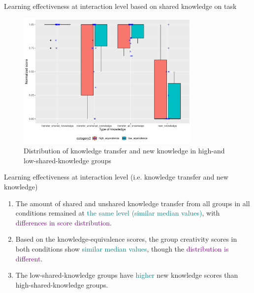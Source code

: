 \begin{frame}{Learning effectiveness at interaction level based on shared knowledge on task}
    \begin{figure}[tb]
     \begin{center}
      \includegraphics[width=90mm]{images/rqb_dist-equivalence-all-redraw.pdf}
      \end{center}
      \caption{Distribution of knowledge transfer and new knowledge in high-and low-shared-knowledge groups}
      \label{rqb::dist_shared}  
    \end{figure}
    
\end{frame}



\begin{frame}{Learning effectiveness at interaction level (i.e. knowledge transfer and new knowledge)}
    \begin{enumerate}
        \item <1> The amount of shared and unshared knowledge transfer from all groups in all conditions remained at \textcolor{teal}{the same level (similar median values)}, with \textcolor{purple}{differences in score distribution}.
        \item <2-3> Based on the knowledge-equivalence scores, the group creativity scores in both conditions show \textcolor{teal}{similar median values}, though the \textcolor{purple}{distribution is different}. 
        \item <3> The low-shared-knowledge groups have \textcolor{teal}{higher} new knowledge scores than high-shared-knowledge groups.
    \end{enumerate}
\end{frame}


